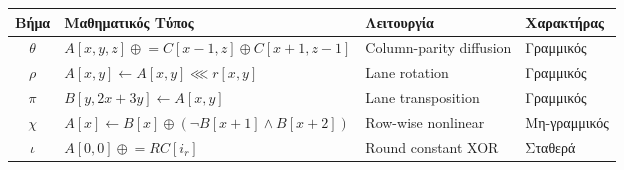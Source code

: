 \begin{tabular}{@{} c l l l @{}}
  \toprule
  \textbf{Βήμα} & \textbf{Μαθηματικός Τύπος} & \textbf{Λειτουργία} & \textbf{Χαρακτήρας} \\
  \midrule
  $\theta$ &
    $A[x,y,z] \mathrel{\oplus}= C[x{-}1,z] \oplus C[x{+}1, z{-}1]$ &
    Column-parity diffusion &
    Γραμμικός \\[4pt]
  $\rho$ &
    $A[x,y] \leftarrow A[x,y] \lll r[x,y]$ &
    Lane rotation &
    Γραμμικός \\[4pt]
  $\pi$ &
    $B[y, 2x{+}3y] \leftarrow A[x,y]$ &
    Lane transposition &
    Γραμμικός \\[4pt]
  $\chi$ &
    $A[x] \leftarrow B[x] \oplus (\lnot B[x{+}1] \land B[x{+}2])$ &
    Row-wise nonlinear &
    Μη-γραμμικός \\[4pt]
  $\iota$ &
    $A[0,0] \mathrel{\oplus}= RC[i_r]$ &
    Round constant XOR &
    Σταθερά \\
  \bottomrule
\end{tabular}
